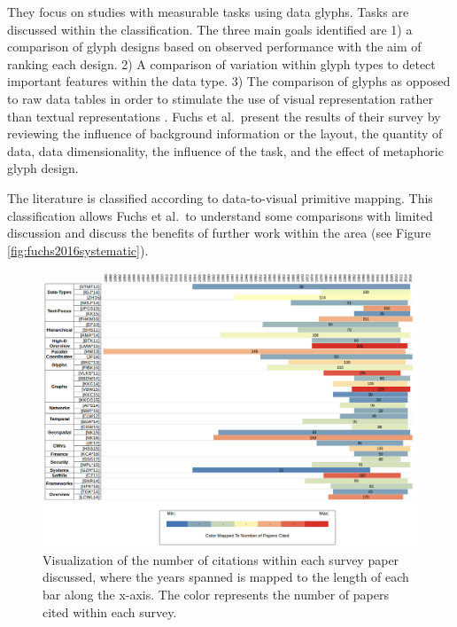 They focus on studies with measurable tasks using data glyphs. Tasks are discussed within the classification. The three main goals identified are 1) a comparison of glyph designs based on observed performance with the aim of ranking each design. 2) A comparison of variation within glyph types to detect important features within the data type. 3) The comparison of glyphs as opposed to raw data tables in order to stimulate the use of visual representation rather than textual representations \cite{fuchs2016systematic}. Fuchs et al.\ present the results of their survey by reviewing the influence of background information or the layout, the quantity of data, data dimensionality, the influence of the task, and the effect of metaphoric glyph design.

The literature is classified according to data-to-visual primitive mapping. This classification allows Fuchs et al.\ to understand some comparisons with limited discussion and discuss the benefits of further work within the area (see Figure \ref{fig:fuchs2016systematic}).

\begin{figure}[t]
\begin{center}
\includegraphics[width=1\textwidth]{images/citationvis5}
\caption{Visualization of the number of citations within each survey paper discussed, where the years spanned is mapped to the length of each bar along the x-axis. The color represents the number of papers cited within each survey.} \label{fig: citationvis}
\end{center}
\end{figure}

